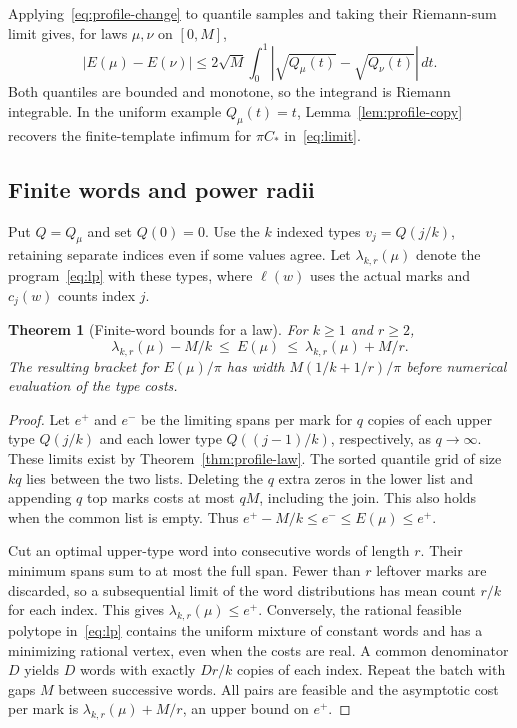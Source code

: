 \documentclass[11pt,letterpaper]{article}
\newtheorem{theorem}{Theorem}
\theoremstyle{definition}\newtheorem{definition}[theorem]{Definition}
\theoremstyle{remark}\newtheorem{remark}[theorem]{Remark}
\newcommand{\CC}{C_\ast}
\begin{document}
Applying~\eqref{eq:profile-change} to quantile samples and taking their
Riemann-sum limit gives, for laws $\mu,\nu$ on $[0,M]$,
\[
 |E(\mu)-E(\nu)|\le2\sqrt M
 \int_0^1|\sqrt{Q_\mu(t)}-\sqrt{Q_\nu(t)}|\,dt .
\]
Both quantiles are bounded and monotone, so the integrand is Riemann
integrable. In the uniform example $Q_\mu(t)=t$, Lemma~\ref{lem:profile-copy}
recovers the finite-template infimum for $\pi\CC$ in~\eqref{eq:limit}.

\subsection{Finite words and power radii}

Put $Q=Q_\mu$ and set $Q(0)=0$. Use the $k$ indexed types $v_j=Q(j/k)$,
retaining separate indices even if some values agree. Let
$\lambda_{k,r}(\mu)$ denote the program~\eqref{eq:lp} with these
types, where $\ell(w)$ uses the actual marks and $c_j(w)$ counts index $j$.

\begin{theorem}[Finite-word bounds for a law]\label{thm:profile-words}
For $k\ge1$ and $r\ge2$,
\[
 \lambda_{k,r}(\mu)-M/k\ \le\ E(\mu)\ \le\ \lambda_{k,r}(\mu)+M/r.
\]
The resulting bracket for $E(\mu)/\pi$ has width $M(1/k+1/r)/\pi$
before numerical evaluation of the type costs.
\end{theorem}
\begin{proof}
Let $e^+$ and $e^-$ be the limiting spans per mark for $q$ copies of
each upper type $Q(j/k)$ and each lower type $Q((j-1)/k)$, respectively,
as $q\to\infty$. These limits exist by Theorem~\ref{thm:profile-law}.
The sorted quantile grid of size $kq$ lies between the two lists.
Deleting the $q$ extra zeros in the lower list and appending $q$ top
marks costs at most $qM$, including the join. This also holds when the
common list is empty. Thus $e^+-M/k\le e^-\le E(\mu)\le e^+$.

Cut an optimal upper-type word into consecutive words of length $r$.
Their minimum spans sum to at most the full span. Fewer than $r$ leftover
marks are discarded, so a subsequential limit of the word distributions
has mean count $r/k$ for each index. This gives $\lambda_{k,r}(\mu)\le e^+$.
Conversely, the rational feasible polytope in~\eqref{eq:lp} contains the
uniform mixture of constant words and has a minimizing rational vertex,
even when the costs are real. A common denominator $D$ yields $D$ words
with exactly $Dr/k$ copies of each index. Repeat the batch with gaps $M$
between successive words. All pairs are feasible and the asymptotic cost
per mark is $\lambda_{k,r}(\mu)+M/r$, an upper bound on $e^+$.
\end{proof}
\end{document}
